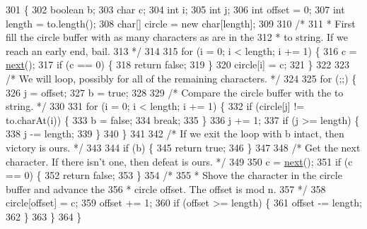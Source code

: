 \begin{DoxyCode}
301                                                             \{
302         \textcolor{keywordtype}{boolean} b;
303         \textcolor{keywordtype}{char} c;
304         \textcolor{keywordtype}{int} i;
305         \textcolor{keywordtype}{int} j;
306         \textcolor{keywordtype}{int} offset = 0;
307         \textcolor{keywordtype}{int} length = to.length();
308         \textcolor{keywordtype}{char}[] circle = \textcolor{keyword}{new} \textcolor{keywordtype}{char}[length];
309 
310         \textcolor{comment}{/*}
311 \textcolor{comment}{         * First fill the circle buffer with as many characters as are in the}
312 \textcolor{comment}{         * to string. If we reach an early end, bail.}
313 \textcolor{comment}{         */}
314 
315         \textcolor{keywordflow}{for} (i = 0; i < length; i += 1) \{
316             c = \hyperlink{classorg_1_1json_1_1_j_s_o_n_tokener_ae129753dbe43ea50aa34e3c06773fdfb}{next}();
317             \textcolor{keywordflow}{if} (c == 0) \{
318                 \textcolor{keywordflow}{return} \textcolor{keyword}{false};
319             \}
320             circle[i] = c;
321         \}
322 
323         \textcolor{comment}{/* We will loop, possibly for all of the remaining characters. */}
324 
325         \textcolor{keywordflow}{for} (;;) \{
326             j = offset;
327             b = \textcolor{keyword}{true};
328 
329             \textcolor{comment}{/* Compare the circle buffer with the to string. */}
330 
331             \textcolor{keywordflow}{for} (i = 0; i < length; i += 1) \{
332                 \textcolor{keywordflow}{if} (circle[j] != to.charAt(i)) \{
333                     b = \textcolor{keyword}{false};
334                     \textcolor{keywordflow}{break};
335                 \}
336                 j += 1;
337                 \textcolor{keywordflow}{if} (j >= length) \{
338                     j -= length;
339                 \}
340             \}
341 
342             \textcolor{comment}{/* If we exit the loop with b intact, then victory is ours. */}
343 
344             \textcolor{keywordflow}{if} (b) \{
345                 \textcolor{keywordflow}{return} \textcolor{keyword}{true};
346             \}
347 
348             \textcolor{comment}{/* Get the next character. If there isn't one, then defeat is ours. */}
349 
350             c = \hyperlink{classorg_1_1json_1_1_j_s_o_n_tokener_ae129753dbe43ea50aa34e3c06773fdfb}{next}();
351             \textcolor{keywordflow}{if} (c == 0) \{
352                 \textcolor{keywordflow}{return} \textcolor{keyword}{false};
353             \}
354             \textcolor{comment}{/*}
355 \textcolor{comment}{             * Shove the character in the circle buffer and advance the}
356 \textcolor{comment}{             * circle offset. The offset is mod n.}
357 \textcolor{comment}{             */}
358             circle[offset] = c;
359             offset += 1;
360             \textcolor{keywordflow}{if} (offset >= length) \{
361                 offset -= length;
362             \}
363         \}
364     \}
\end{DoxyCode}


